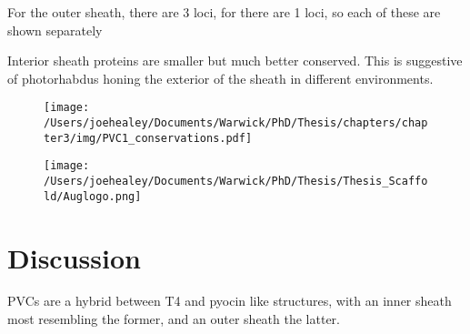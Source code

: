 For the outer sheath, there are 3 loci, for there are 1 loci, so each of these are shown separately



Interior sheath proteins are smaller but much better conserved. This is suggestive of photorhabdus honing the exterior of the sheath in different environments.

\clearpage
\begin{figure}[h!]
{\centering
    \texttt{[image: /Users/joehealey/Documents/Warwick/PhD/Thesis/chapters/chapter3/img/PVC1\_conservations.pdf]}
}

\texttt{[image: /Users/joehealey/Documents/Warwick/PhD/Thesis/Thesis\_Scaffold/Auglogo.png]}

\end{figure}
\clearpage



























\section{Discussion}
PVCs are a hybrid between T4 and pyocin like structures, with an inner sheath most resembling the former, and an outer sheath the latter.








